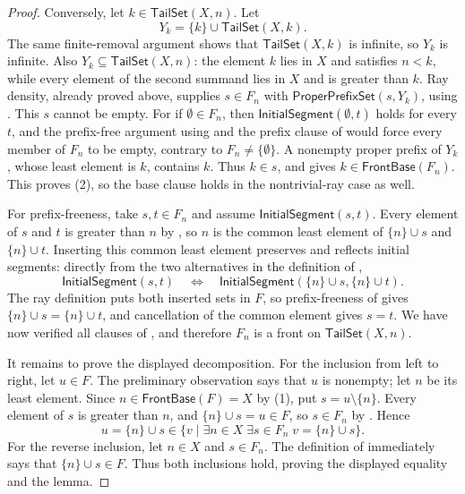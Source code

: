 \begin{proof}
Conversely, let $k\in\mathsf{TailSet}(X,n)$.  Let
\[
 Y_k=\{k\}\cup\mathsf{TailSet}(X,k).
\]
The same finite-removal argument shows that $\mathsf{TailSet}(X,k)$ is
infinite, so $Y_k$ is infinite.  Also $Y_k\subseteq\mathsf{TailSet}(X,n)$:
the element $k$ lies in $X$ and satisfies $n<k$, while every element of the
second summand lies in $X$ and is greater than $k$.  Ray density, already
proved above, supplies $s\in F_n$ with
$\mathsf{ProperPrefixSet}(s,Y_k)$, using .  This
$s$ cannot be empty.  For if $\emptyset\in F_n$, then
$\mathsf{InitialSegment}(\emptyset,t)$ holds for every $t$, and the
prefix-free argument using  and the prefix clause
of  would force every member of $F_n$ to be empty, contrary
to $F_n\ne\{\emptyset\}$.  A nonempty proper prefix of $Y_k$, whose least
element is $k$, contains $k$.  Thus $k\in s$, and  gives
$k\in\mathsf{FrontBase}(F_n)$.  This proves (2), so the base clause holds in
the nontrivial-ray case as well.

For prefix-freeness, take $s,t\in F_n$ and assume
$\mathsf{InitialSegment}(s,t)$.  Every element of $s$ and $t$ is greater
than $n$ by , so $n$ is the common least element of
$\{n\}\cup s$ and $\{n\}\cup t$.  Inserting this common least element
preserves and reflects initial segments: directly from the two alternatives
in the definition of ,
\[
\mathsf{InitialSegment}(s,t)\quad\Longleftrightarrow\quad
\mathsf{InitialSegment}(\{n\}\cup s,\{n\}\cup t).
\]
The ray definition puts both inserted sets in $F$, so prefix-freeness of
 gives $\{n\}\cup s=\{n\}\cup t$, and cancellation of the
common element gives $s=t$.  We have now verified all clauses of
, and therefore $F_n$ is a front on
$\mathsf{TailSet}(X,n)$.

It remains to prove the displayed decomposition.  For the inclusion from
left to right, let $u\in F$.  The preliminary observation says that $u$ is
nonempty; let $n$ be its least element.  Since
$n\in\mathsf{FrontBase}(F)=X$ by (1), put $s=u\setminus\{n\}$.  Every
element of $s$ is greater than $n$, and $\{n\}\cup s=u\in F$, so
$s\in F_n$ by .  Hence
\[
u=\{n\}\cup s\in
\{v\mid\exists n\in X\;\exists s\in F_n\;v=\{n\}\cup s\}.
\]
For the reverse inclusion, let $n\in X$ and $s\in F_n$.  The definition of
 immediately says that $\{n\}\cup s\in F$.  Thus both
inclusions hold, proving the displayed equality and the lemma.
\end{proof}
